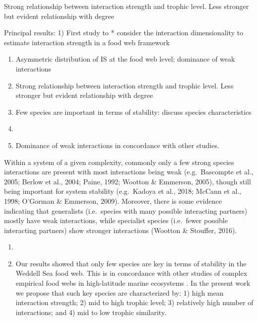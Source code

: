 \documentclass[gc, manuscript]{copernicus}
\providecommand{\tightlist}{%
  \setlength{\itemsep}{0pt}\setlength{\parskip}{0pt}}
\begin{document}
Strong relationship between interaction strength and trophic level. Less
stronger but evident relationship with degree

Principal results: 1) First study to * consider the interaction
dimensionality to estimate interaction strength in a food web framework

\begin{enumerate}
\def\labelenumi{\arabic{enumi})}
\setcounter{enumi}{1}
\item
  Asymmetric distribution of IS at the food web level; dominance of weak
  interactions
\item
  Strong relationship between interaction strength and trophic level.
  Less stronger but evident relationship with degree
\item
  Few species are important in terms of stability: discuss species
  characteristics
\item
\item
  Dominance of weak interactions in concordance with other studies.
\end{enumerate}

Within a system of a given complexity, commonly only a few strong
species interactions are present with most interactions being weak
(e.g.~Bascompte et al., 2005; Berlow et al., 2004; Paine, 1992; Wootton
\& Emmerson, 2005), though still being important for system stability
(e.g.~Kadoya et al., 2018; McCann et al., 1998; O'Gorman \& Emmerson,
2009). Moreover, there is some evidence indicating that generalists
(i.e.~species with many possible interacting partners) mostly have weak
interactions, while specialist species (i.e.~fewer possible interacting
partners) show stronger interactions (Wootton \& Stouffer, 2016).

\begin{enumerate}
\def\labelenumi{\arabic{enumi})}
\setcounter{enumi}{2}
\tightlist
\item
\item
  Our results showed that only few species are key in terms of stability
  in the Weddell Sea food web. This is in concordance with other studies
  of complex empirical food webs in high-latitude marine ecosystems
  \citep{Kortsch2015, Marina2018, Rodriguez2022}. In the present work we
  propose that such key species are characterized by: 1) high mean
  interaction strength; 2) mid to high trophic level; 3) relatively high
  number of interactions; and 4) mid to low trophic similarity.
\end{enumerate}
\end{document}
